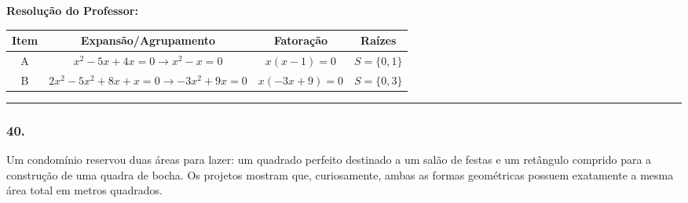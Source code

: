 \begin{multicols*}{2}
\ifgabarito
    \begin{tcolorbox}[colback=CorTitUm!5, colframe=CorTitUm, boxrule=1pt, arc=4pt, left=6pt, right=6pt, top=6pt, bottom=6pt]
    \small\textbf{\textcolor{CorTitUm}{Resolução do Professor:}}\par\vspace{0.1cm}
    \color{CinzaEscuro}
    \begin{center}
    \begin{tabular}{|c|c|c|c|}
    \hline
    \textbf{Item} & \textbf{Expansão/Agrupamento} & \textbf{Fatoração} & \textbf{Raízes} \\
    \hline
    A & $x^2 - 5x + 4x = 0 \rightarrow x^2 - x = 0$ & $x(x - 1) = 0$ & $S = \{0, 1\}$ \\
    \hline
    B & $2x^2 - 5x^2 + 8x + x = 0 \rightarrow -3x^2 + 9x = 0$ & $x(-3x + 9) = 0$ & $S = \{0, 3\}$ \\
    \hline
    \end{tabular}
    \end{center}
    \end{tcolorbox}
\fi

\par\vspace{\espacoQuestao}

\noindent\textcolor{CorLinha}{\rule{\linewidth}{0.5pt}} 
\par\vspace{\espacoPreQuestao}
\subsubsection*{40.} Um condomínio reservou duas áreas para lazer: um quadrado perfeito destinado a um salão de festas e um retângulo comprido para a construção de uma quadra de bocha. Os projetos mostram que, curiosamente, ambas as formas geométricas possuem exatamente a mesma área total em metros quadrados.

\begin{center}
\begin{adjustbox}{trim=0cm 0cm 0cm 0cm, clip, max width=\larguraTikz}
\end{adjustbox}
\end{center}
\end{multicols*}
